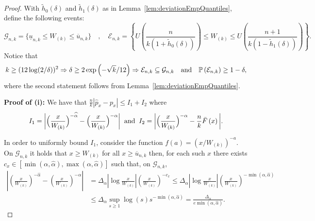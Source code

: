 \documentclass{article}
\numberwithin{equation}{section}
\renewcommand{\P}{\mathbb{P}}
\begin{document}
%
\begin{proof}
    With
    \(\tilde{h}_0(\delta)\) and \(\tilde{h}_1(\delta)\)
    as in Lemma~\ref{lem:deviationEmpQuantiles}, define the
    following events:
    \begin{equation*}
        \mathcal{G}_{n,k} = \{\underline{u}_{n,k}\leq W_{(k)}\leq
        \overline{u}_{n,k}\} \quad,\quad
        \mathcal{E}_{n,k} = \left\{
            U\left(\frac{n}{k(1+\tilde{h}_0(\delta))}\right)\leq W_{(k)} \leq
        U\left(\frac{n+1}{k(1-\tilde{h}_1(\delta))}\right) \right\}.
    \end{equation*}
    Notice that
    \begin{equation}\label{eq:inclusion}
        k\geq (12\log(2/\delta))^2\Rightarrow
        \delta\geq
        2\exp{\left(-\sqrt{k}/12\right)}
        \Rightarrow
        \mathcal{E}_{n,k}\subseteq\mathcal{G}_{n,k}\quad\textnormal{and}\quad\P\left(\mathcal{E}_{n,k}\right)\geq
        1-\delta,
    \end{equation}
    where the second statement follows from
    Lemma~\ref{lem:deviationEmpQuantiles}.

    \textbf{Proof of (i):} We have that \(\frac{n}{k}|\widehat p_{x}
        - p_{x}|\leq
    I_1+I_2\) where
    \begin{equation*}
        I_1 = \bigg|  \Big(\frac{x}{W_{(k)}} \Big)^{-\widehat \alpha}  -
        \Big(\frac{x}{W_{(k)}}  \Big)^{- \alpha} \bigg|\;\;
        \textnormal{and}\;\;I_2  = \bigg|  \Big(\frac{x}{W_{(k)}}
        \Big)^{-\alpha} - \frac{n}{k}\bar{F}\left(x\right)  \bigg|.
    \end{equation*}

    In order to uniformly bound \(I_1\), consider the function
    \(f(a)=(x/W_{(k)})^{-a}\). On \(\mathcal{G}_{n,k}\) it holds that
    \(x\geq W_{(k)}\) for all \(x\geq \overline{u}_{n,k}\) then,
    for each such \(x\) there exists \(c_x\in [\min(\alpha,
            \hat{\alpha}), \max(\alpha,
    \hat{\alpha})]\) such that, on \(\mathcal{G}_{n,k}\),
    \begin{align}
        \left|  \left(\frac{x}{W_{(k)}}\right)^{-\widehat
        \alpha}-\left(\frac{x}{W_{(k)}}\right)^{- \alpha} \right| & =
        \Delta_{\alpha}\left|\log{\frac{x}{W_{(k)}}}\right|\left(\frac{x}{W_{(k)}}\right)^{-c_x}
        \leq
        \Delta_{\alpha}\left|\log{\frac{x}{W_{(k)}}}\right|\left(\frac{x}{W_{(k)}}\right)^{-\min{(\alpha,\hat{\alpha})}}\nonumber
        \\
        & \leq \Delta_{\alpha} \sup_{s\geq 1} \log(s)s^{-\min{(\alpha,
        \hat{\alpha})}} = \frac{\Delta_{\alpha}}{e \min{(\alpha,
        \hat{\alpha})}}.\label{eq:bound_I_1}
    \end{align}


\end{proof}
\end{document}
